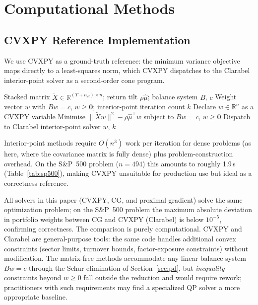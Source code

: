 \section{Computational Methods}\label{sec:solvers}

\subsection{CVXPY Reference Implementation}

We use CVXPY \cite{diamond2016} as a ground-truth reference: the minimum variance
objective maps directly to a least-squares norm, which CVXPY dispatches to the Clarabel
interior-point solver \cite{clarabel2024} as a second-order cone program.

\begin{algorithm}[ht]
\caption{CVXPY reference solver}\label{alg:cvxpy}
\begin{algorithmic}[1]
\Require Stacked matrix $\tilde{X} \in \mathbb{R}^{(T+n_R)\times n}$;\; return tilt $\rho\hat\mu$;\;
         balance system $B$, $c$
\Ensure Weight vector $w$ with $Bw = c$, $w \geq \mathbf{0}$;\; interior-point iteration count $k$
\State Declare $w \in \mathbb{R}^n$ as a CVXPY variable
\State Minimise $\|\tilde{X}w\|^2 - \rho\hat\mu^\top w$
  \Statex\hspace{1.5em} subject to $Bw = c$,\; $w \geq \mathbf{0}$
\State Dispatch to Clarabel interior-point solver \cite{clarabel2024}
\State \Return $w$,\; $k$
\end{algorithmic}
\end{algorithm}

Interior-point methods require $O(n^3)$ work per iteration for dense problems (as here,
where the covariance matrix is fully dense) plus problem-construction overhead.
On the S\&P~500 problem ($n = 494$) this amounts to roughly 1.9\,s (Table~\ref{tab:sp500}),
making CVXPY unsuitable for production use but ideal as a correctness reference.

All solvers in this paper (CVXPY, CG, and proximal gradient) solve the
same optimization problem; on the S\&P~500 problem the maximum absolute deviation in
portfolio weights between CG and CVXPY (Clarabel) is below $10^{-5}$, confirming
correctness. The comparison is purely computational. CVXPY and Clarabel are general-purpose tools: the same
code handles additional convex constraints (sector limits, turnover bounds, factor-exposure
constraints) without modification. The matrix-free methods accommodate any linear balance
system $Bw = c$ through the Schur elimination of Section~\ref{sec:pd}, but \emph{inequality}
constraints beyond $w \geq 0$ fall outside the reduction and would require rework;
practitioners with such requirements may find a specialized QP solver a more appropriate
baseline.

